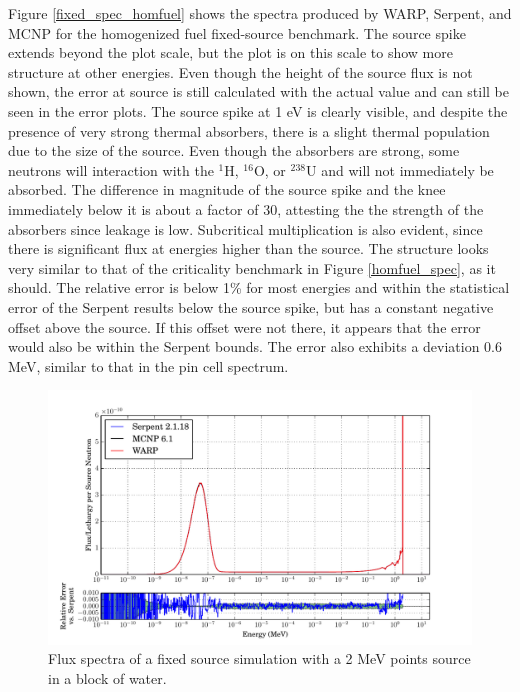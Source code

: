 Figure \ref{fixed_spec_homfuel} shows the spectra produced by WARP, Serpent, and MCNP for the homogenized fuel fixed-source benchmark.  The source spike extends beyond the plot scale, but the plot is on this scale to show more structure at other energies.  Even though the height of the source flux is not shown, the error at source is still calculated with the actual value and can still be seen in the error plots.  The source spike at 1 eV is clearly visible, and despite the presence of very strong thermal absorbers, there is a slight thermal population due to the size of the source.  Even though the absorbers are strong, some neutrons will interaction with the $^{1}$H, $^{16}$O, or $^{238}$U and will not immediately be absorbed.  The difference in magnitude of the source spike and the knee immediately below it is about a factor of 30, attesting the the strength of the absorbers since leakage is low.  Subcritical multiplication is also evident, since there is significant flux at energies higher than the source.  The structure looks very similar to that of the criticality benchmark in Figure \ref{homfuel_spec}, as it should.  The relative error is below 1\% for most energies and within the statistical error of the Serpent results below the source spike, but has a constant negative offset above the source.  If this offset were not there, it appears that the error would also be within the Serpent bounds.  The error also exhibits a deviation 0.6 MeV, similar to that in the pin cell spectrum.  

\begin{figure}[h!]
\centering
\includegraphics[width=\textwidth,trim= 1cm 0cm 1cm 0cm]{graphics/finalresults/fixed_spec_water.pdf}
\caption{Flux spectra of a fixed source simulation with a 2 MeV points source in a block of water. \label{fixed_spec_water} }
\end{figure}

